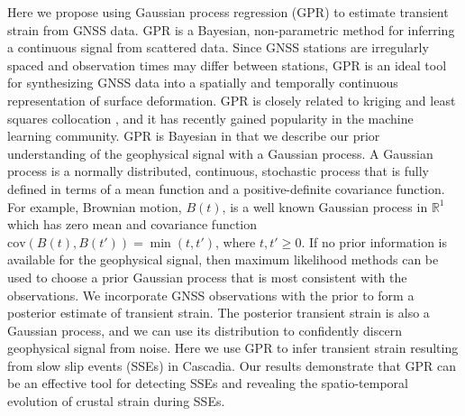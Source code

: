 \documentclass[10pt,letter]{article}
\begin{document}
Here we propose using Gaussian process regression (GPR) \citep{Rasmussen2006} to estimate transient strain from GNSS data. GPR is a Bayesian, non-parametric method for inferring a continuous signal from scattered data. Since GNSS stations are irregularly spaced and observation times may differ between stations, GPR is an ideal tool for synthesizing GNSS data into a spatially and temporally continuous representation of surface deformation. GPR is closely related to kriging \citep{Cressie1992} and least squares collocation \citep{Kato1998}, and it has recently gained popularity in the machine learning community. GPR is Bayesian in that we describe our prior understanding of the geophysical signal with a Gaussian process. A Gaussian process is a normally distributed, continuous, stochastic process that is fully defined in terms of a mean function and a positive-definite covariance function. For example, Brownian motion, $B(t)$, is a well known Gaussian process in $\mathbb{R}^1$ which has zero mean and covariance function $\mathrm{cov}(B(t),B(t')) = \min(t,t')$, where $t,t' \ge 0$. If no prior information is available for the geophysical signal, then maximum likelihood methods can be used to choose a prior Gaussian process that is most consistent with the observations.  We incorporate GNSS observations with the prior to form a posterior estimate of transient strain.  The posterior transient strain is also a Gaussian process, and we can use its distribution to confidently discern geophysical signal from noise. Here we use GPR to infer transient strain resulting from slow slip events (SSEs) in Cascadia. Our results demonstrate that GPR can be an effective tool for detecting SSEs and revealing the spatio-temporal evolution of crustal strain during SSEs. 
\end{document}

